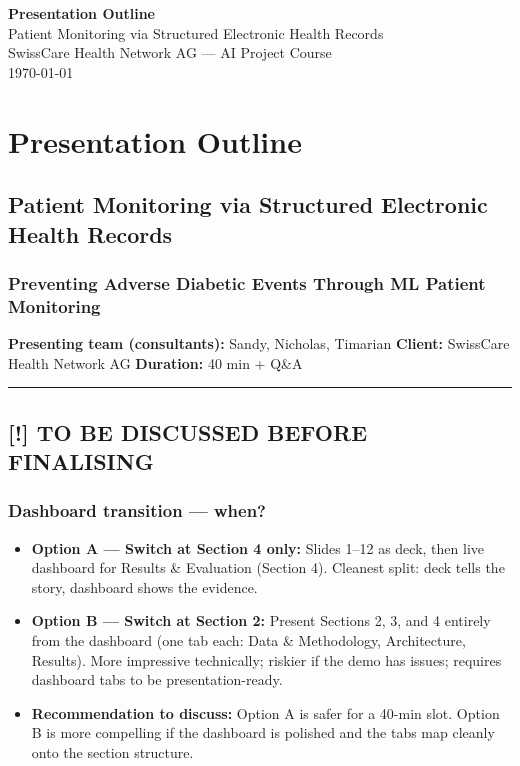 \documentclass[11pt,a4paper]{article}
\begin{document}
\begin{titlepage}
\centering\vspace*{3cm}
{\Huge\bfseries\color{navyblue} Presentation Outline\\[0.5em]}
{\large\color{medblue} Patient Monitoring via Structured Electronic Health Records\\[2em]}
{\normalsize SwissCare Health Network AG --- AI Project Course}\\[0.5em]
{\small\today}
\end{titlepage}
\tableofcontents\newpage
\section{Presentation Outline}
\subsection{Patient Monitoring via Structured Electronic Health Records}
\subsubsection{Preventing Adverse Diabetic Events Through ML Patient Monitoring}
\textbf{Presenting team (consultants):} Sandy, Nicholas, Timarian
\textbf{Client:} SwissCare Health Network AG
\textbf{Duration:} 40 min + Q\&A

\noindent\rule{\linewidth}{0.4pt}

\begin{mdframed}[style=warnbox]
\end{mdframed}
\subsection{\textbf{[!]} TO BE DISCUSSED BEFORE FINALISING}

\subsubsection{Dashboard transition --- when?}
\begin{itemize}
\item \textbf{Option A --- Switch at Section 4 only:} Slides 1--12 as deck, then live dashboard for Results \& Evaluation (Section 4). Cleanest split: deck tells the story, dashboard shows the evidence.
\item \textbf{Option B --- Switch at Section 2:} Present Sections 2, 3, and 4 entirely from the dashboard (one tab each: Data \& Methodology, Architecture, Results). More impressive technically; riskier if the demo has issues; requires dashboard tabs to be presentation-ready.
\item \textbf{Recommendation to discuss:} Option A is safer for a 40-min slot. Option B is more compelling if the dashboard is polished and the tabs map cleanly onto the section structure.
\end{itemize}
\end{document}

